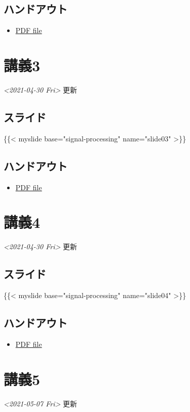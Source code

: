 \documentclass[11pt]{article}
\begin{document}
\subsection{ハンドアウト}
\label{sec:org74d3d28}
\begin{itemize}
\item \href{https://noboru-murata.github.io/signal-processing/pdfs/slide02.pdf}{PDF file}
\end{itemize}

\section{講義3}
\label{sec:org708b25f}
\textit{<2021-04-30 Fri> } 更新
\subsection{スライド}
\label{sec:org71a467d}
\{\{< myslide base="signal-processing" name="slide03" >\}\}
\subsection{ハンドアウト}
\label{sec:org6fcea20}
\begin{itemize}
\item \href{https://noboru-murata.github.io/signal-processing/pdfs/slide03.pdf}{PDF file}
\end{itemize}

\section{講義4}
\label{sec:orgb7cdfa3}
\textit{<2021-04-30 Fri> } 更新
\subsection{スライド}
\label{sec:org437975e}
\{\{< myslide base="signal-processing" name="slide04" >\}\}
\subsection{ハンドアウト}
\label{sec:org0672e59}
\begin{itemize}
\item \href{https://noboru-murata.github.io/signal-processing/pdfs/slide04.pdf}{PDF file}
\end{itemize}

\section{講義5}
\label{sec:org38a4656}
\textit{<2021-05-07 Fri> } 更新
\end{document}
